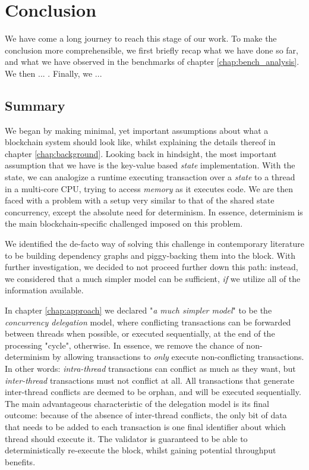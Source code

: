 \chapter{Conclusion} \label{chap:conclusion}

We have come a long journey to reach this stage of our work. To make the conclusion more
comprehensible, we first briefly recap what we have done so far, and what we have observed in the
benchmarks of chapter \ref{chap:bench_analysis}. We then ... . Finally, we ...

\section{Summary}
We began by making minimal, yet important assumptions about what a blockchain system should look
like, whilst explaining the details thereof in chapter \ref{chap:background}. Looking back in
hindsight, the most important assumption that we have is the key-value based \textit{state}
implementation. With the state, we can analogize a runtime executing transaction over a
\textit{state} to a thread in a multi-core CPU, trying to access \textit{memory} as it executes
code. We are then faced with a problem with a setup very similar to that of the shared state
concurrency, except the absolute need for determinism. In essence, determinism is the main
blockchain-specific challenged imposed on this problem.

We identified the de-facto way of solving this challenge in contemporary literature to be building
dependency graphs and piggy-backing them into the block. With further investigation, we decided to
not proceed further down this path: instead, we considered that a much simpler model can be
sufficient, \textit{if} we utilize all of the information available.

In chapter \ref{chap:approach} we declared "\textit{a much simpler model}" to be the
\textit{concurrency delegation} model, where conflicting transactions can be forwarded between
threads when possible, or executed sequentially, at the end of the processing "cycle", otherwise. In
essence, we remove the chance of non-determinism by allowing transactions to \textit{only} execute
non-conflicting transactions. In other words: \textit{intra-thread} transactions can conflict as
much as they want, but \textit{inter-thread} transactions must not conflict at all. All transactions
that generate inter-thread conflicts are deemed to be orphan, and will be executed sequentially. The
main advantageous characteristic of the delegation model is its final outcome: because of the
absence of inter-thread conflicts, the only bit of data that needs to be added to each transaction
is one final identifier about which thread should execute it. The validator is guaranteed to be able
to deterministically re-execute the block, whilst gaining potential throughput benefits.


